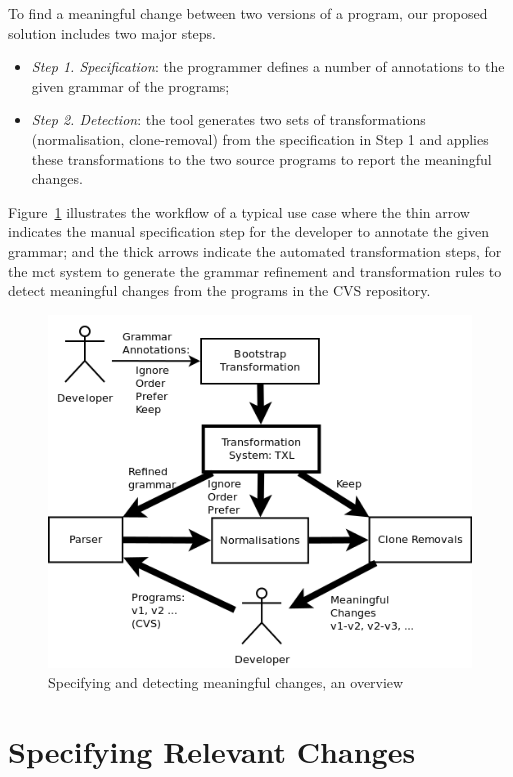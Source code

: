 \documentclass[10pt, conference, compsocconf]{IEEEtran}
\begin{document}
To find a meaningful change between two versions of a program, our proposed solution includes two major steps. \begin{itemize}\item {\em Step 1. Specification}: the programmer defines a number of annotations to the given grammar of the programs; \item {\em Step 2. Detection}: the tool generates two sets of transformations (normalisation, clone-removal) from the specification in Step 1 and applies these transformations to the two source programs to report the meaningful changes.\end{itemize} Figure~\ref{fig:overview} illustrates the workflow of a typical use case where the thin arrow indicates the manual specification step for the developer to annotate the given grammar; and the thick arrows indicate the automated transformation steps, for the mct system to generate the grammar refinement and transformation rules to detect meaningful changes from the programs in the CVS repository. 
\begin{figure}\centering
\includegraphics[width=\columnwidth]{code/overview}
\caption{Specifying and detecting meaningful changes, an overview}\label{fig:overview}
\end{figure}

\section{Specifying Relevant Changes}\label{sec:approach}
\end{document}
